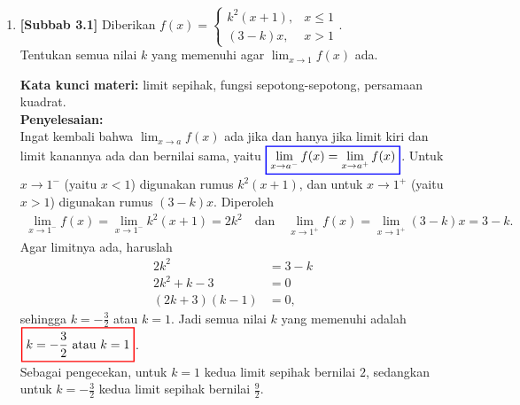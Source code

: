 \documentclass[10pt,openany,a4paper]{article}
\theoremstyle{definition}
\theoremstyle{definition}
\theoremstyle{plain}
\newenvironment{jawab}[2][tes]{%
\par\noindent\textbf{Kata kunci materi:} #1.\\
\textbf{Penyelesaian:} #2%
}{}
\begin{document}
\begin{enumerate}
    \item \textbf{[Subbab 3.1]} Diberikan $f(x)=\begin{cases}
        k^2(x+1), & x\leq 1\\
        (3-k)x, & x>1
    \end{cases}$.\\
    Tentukan semua nilai $k$ yang memenuhi agar $\displaystyle\lim_{x\to 1}f(x)$ ada.
    \begin{jawab}[limit sepihak, fungsi sepotong-sepotong, persamaan kuadrat]{~\\
        Ingat kembali bahwa $\displaystyle\lim_{x\to a}f(x)$ ada jika dan hanya jika limit kiri dan limit kanannya ada dan bernilai sama, yaitu $\colorlet{oldcolor}{.}
        \color{blue}
        \setlength{\fboxrule}{1pt} \boxed{\color{oldcolor}\lim_{x \to a^-} f(x) = \lim_{x \to a^+} f(x)}\color{oldcolor}$. Untuk $x\to 1^-$ (yaitu $x<1$) digunakan rumus $k^2(x+1)$, dan untuk $x\to 1^+$ (yaitu $x>1$) digunakan rumus $(3-k)x$. Diperoleh
        \begin{align*}
            \lim_{x\to 1^-} f(x) = \lim_{x\to 1^-} k^2(x+1) = 2k^2 \quad\text{dan}\quad \lim_{x\to 1^+} f(x) = \lim_{x\to 1^+} (3-k)x = 3-k.
        \end{align*}
        Agar limitnya ada, haruslah
        \begin{align*}
            2k^2 &= 3-k\\
            2k^2+k-3 &= 0\\
            (2k+3)(k-1) &= 0,
        \end{align*}
        sehingga $k=-\frac{3}{2}$ atau $k=1$. Jadi semua nilai $k$ yang memenuhi adalah $\colorlet{oldcolor}{.}
        \color{red}
        \setlength{\fboxrule}{1pt} \boxed{\color{oldcolor}k=-\frac{3}{2} \text{ atau } k=1}\color{oldcolor}$.\\
        Sebagai pengecekan, untuk $k=1$ kedua limit sepihak bernilai $2$, sedangkan untuk $k=-\frac{3}{2}$ kedua limit sepihak bernilai $\frac{9}{2}$.
    }
    \end{jawab}


\end{enumerate}
\end{document}
